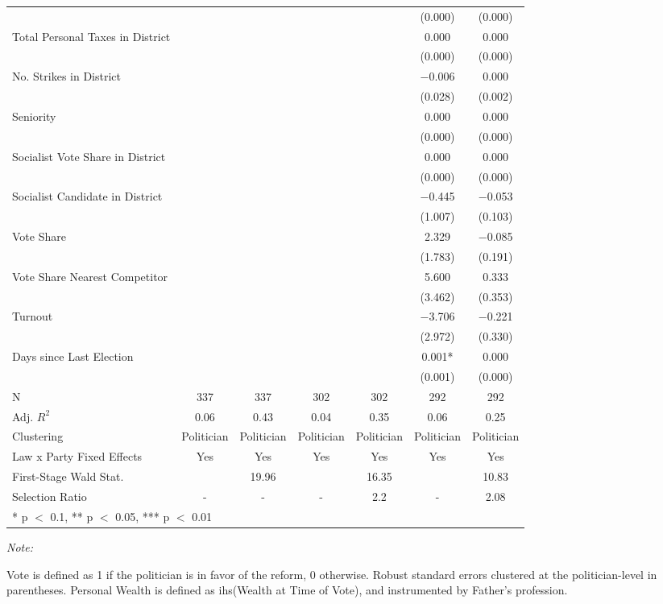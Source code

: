 \begin{table}[!h]
{\begin{threeparttable}
\begin{tabular}[t]{lcccccc}
 &  &  &  &  & (\num{0.000}) & \vphantom{3} (\num{0.000})\\
Total Personal Taxes in District &  &  &  &  & \num{0.000} & \num{0.000}\\
 &  &  &  &  & (\num{0.000}) & \vphantom{2} (\num{0.000})\\
No. Strikes in District &  &  &  &  & \num{-0.006} & \num{0.000}\\
 &  &  &  &  & (\num{0.028}) & (\num{0.002})\\
Seniority &  &  &  &  & \num{0.000} & \num{0.000}\\
 &  &  &  &  & (\num{0.000}) & \vphantom{1} (\num{0.000})\\
Socialist Vote Share in District &  &  &  &  & \num{0.000} & \num{0.000}\\
 &  &  &  &  & (\num{0.000}) & (\num{0.000})\\
Socialist Candidate in District &  &  &  &  & \num{-0.445} & \num{-0.053}\\
 &  &  &  &  & (\num{1.007}) & (\num{0.103})\\
Vote Share &  &  &  &  & \num{2.329} & \num{-0.085}\\
 &  &  &  &  & (\num{1.783}) & (\num{0.191})\\
Vote Share Nearest Competitor &  &  &  &  & \num{5.600} & \num{0.333}\\
 &  &  &  &  & (\num{3.462}) & (\num{0.353})\\
Turnout &  &  &  &  & \num{-3.706} & \num{-0.221}\\
 &  &  &  &  & (\num{2.972}) & (\num{0.330})\\
Days since Last Election &  &  &  &  & \num{0.001}* & \num{0.000}\\
 &  &  &  &  & (\num{0.001}) & (\num{0.000})\\
\midrule
N & \num{337} & \num{337} & \num{302} & \num{302} & \num{292} & \num{292}\\
Adj. $R^2$ & \num{0.06} & \num{0.43} & \num{0.04} & \num{0.35} & \num{0.06} & \num{0.25}\\
Clustering & Politician & Politician & Politician & Politician & Politician & Politician\\
Law x Party Fixed Effects & Yes & Yes & Yes & Yes & Yes & Yes\\
First-Stage Wald Stat. &  & 19.96 &  & 16.35 &  & 10.83\\
Selection Ratio & - & - & - & 2.2 & - & 2.08\\
\bottomrule
\multicolumn{7}{l}{\rule{0pt}{1em}* p $<$ 0.1, ** p $<$ 0.05, *** p $<$ 0.01}\\
\end{tabular}
\begin{tablenotes}[para]
\item \textit{Note: } 
\item Vote is defined as 1 if the politician is in favor of the reform, 0 otherwise. Robust standard errors clustered at the politician-level in parentheses. Personal Wealth is defined as ihs(Wealth at Time of Vote), and instrumented by Father's profession.
\end{tablenotes}
\end{threeparttable}}
\end{table}
